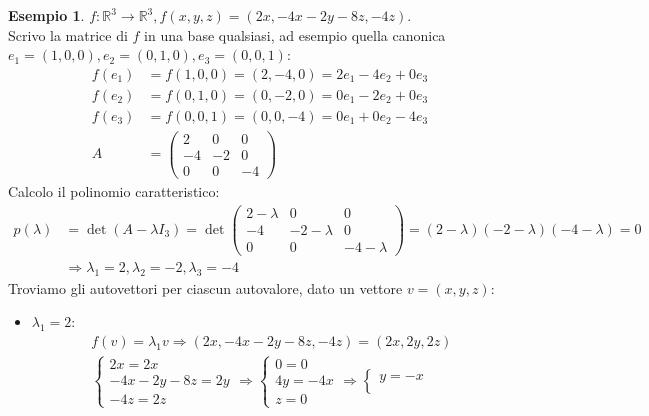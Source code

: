 \documentclass[a4paper]{article}
\theoremstyle{definition}
\newtheorem*{es}{Esempio}
\begin{document}
	\begin{es}
		$f: \mathbb{R}^3 \to \mathbb{R}^3, f(x, y, z) = (2x, -4x - 2y -8z, -4z)$. \\
		Scrivo la matrice di $f$ in una base qualsiasi, ad esempio quella canonica $e_1 = (1, 0, 0), e_2 = (0, 1, 0), e_3 = (0, 0, 1)$:
		\begin{align*}
			f(e_1) &= f(1, 0, 0) = (2, -4, 0) = 2e_1 - 4e_2 + 0e_3 \\
			f(e_2) &= f(0, 1, 0) = (0, -2, 0) = 0e_1 - 2e_2 + 0e_3 \\
			f(e_3) &= f(0, 0, 1) = (0, 0, -4) = 0e_1 + 0e_2 - 4e_3 \\
			A &= \begin{pmatrix}
				2 & 0 & 0 \\
				-4 & -2 & 0 \\
				0 & 0 & -4
			\end{pmatrix}
		\end{align*}
		Calcolo il polinomio caratteristico:
		\begin{align*}
			p(\lambda) &= \det(A - \lambda I_3) = \det \begin{pmatrix}
				2 - \lambda & 0 & 0 \\
				-4 & -2 - \lambda & 0 \\
				0 & 0 & -4 - \lambda
			\end{pmatrix} = (2 - \lambda)(-2 - \lambda)(-4 - \lambda) = 0 \\
			&\Rightarrow \lambda_1 = 2, \lambda_2 = -2, \lambda_3 = - 4
		\end{align*}
		Troviamo gli autovettori per ciascun autovalore, dato un vettore $v = (x, y, z)$:
		\begin{itemize}
			\item $\lambda_1 = 2$:
				\begin{align*}
					f(v) = \lambda_1 v \Rightarrow (2x, -4x - 2y - 8z, -4z) = (2x, 2y, 2z) \\
					\begin{cases}
						2x = 2x \\
						-4x - 2y - 8z = 2y \\
						-4z = 2z
					\end{cases} \Rightarrow \begin{cases}
						0 = 0 \\
						4y = - 4x \\
						z = 0
					\end{cases} \Rightarrow \begin{cases}
						y = - x \\

\end{cases}
\end{align*}
\end{itemize}
\end{es}
\end{document}
